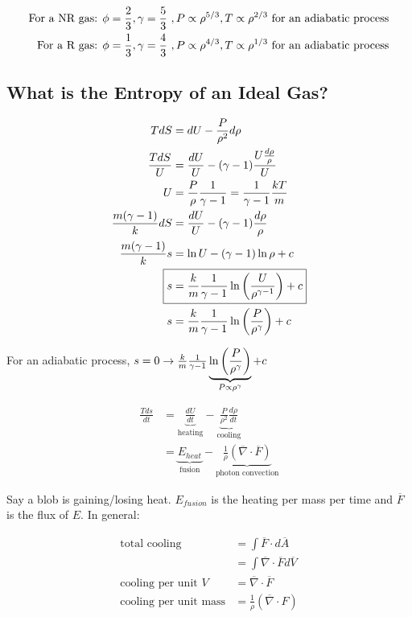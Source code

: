 \begin{align}
\text{For a NR gas: } \phi = \frac{2}{3}, \gamma = \frac{5}{3}~,P\propto \rho^{5/3}, T \propto \rho^{2/3}\text{ for an adiabatic process}\\
\text{For a R gas: } \phi = \frac{1}{3}, \gamma = \frac{4}{3}~,P\propto \rho^{4/3}, T \propto \rho^{1/3}\text{ for an adiabatic process}
\end{align}

\subsection{What is the Entropy of an Ideal Gas?}

\begin{align}
TdS &= dU - \frac{P}{\rho^2}d\rho\\
\frac{TdS}{U} &= \frac{dU}{U} - (\gamma - 1)\frac{U\frac{d\rho}{\rho}}{U}\\
U &=\frac{P}{\rho}\frac{1}{\gamma -1} = \frac{1}{\gamma - 1} \frac{kT}{m}\\
\frac{m(\gamma -1)}{k}dS &= \frac{dU}{U} - (\gamma -1)\frac{d\rho}{\rho}\\
\frac{m(\gamma - 1)}{k}s &= \ln U - (\gamma - 1)\ln \rho + c\\
\Aboxed{s &= \frac{k}{m}\frac{1}{\gamma - 1} \ln \lp \frac{U}{\rho^{\gamma - 1}} \rp  +c}\\	
s &= \frac{k}{m} \frac{1}{\gamma -1} \ln \lp \frac{P}{\rho^\gamma} \rp + c
\end{align}

For an adiabatic process, $s=0 \rightarrow \frac{k}{m} \frac{1}{\gamma -1} \underbrace{\ln \left( \frac{P}{\rho^\gamma} \right)}_{P \propto \rho^\gamma} + c$

\begin{align}
\frac{Tds}{dt} &= \underbrace{\frac{dU}{dt}}_{\text{heating}} - \underbrace{\frac{P}{\rho^2}\frac{d\rho}{dt}}_{\text{cooling}}\\
&= \underbrace{E_{heat}}_{\text{fusion}} - \underbrace{\frac{1}{\rho}(\overline{\nabla} \cdot \overline{F})}_{\text{photon convection}}
\end{align}

Say a blob is gaining/losing heat. $E_{fusion}$ is the heating per mass per time and $\overline{F}$ is the flux of $E$. In general:

\begin{align}
\text{total cooling} &= \int \overline{F}\cdot d\overline{A}\\
&= \int \overline{\nabla} \cdot \overline{F} d\overline{V}\\
\text{cooling per unit $V$} &= \overline{\nabla} \cdot \overline{F}\\
\text{cooling per unit mass} &= \frac{1}{\rho}(\overline{\nabla} \cdot F)
\end{align}

